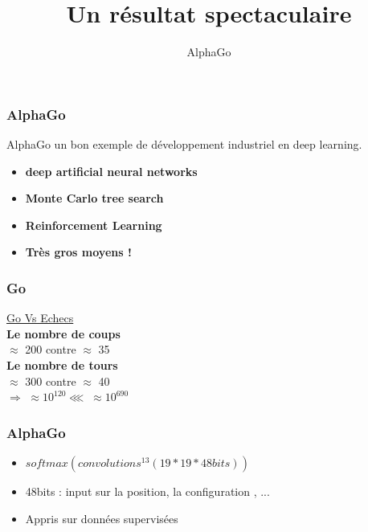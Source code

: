 \documentclass{formation}
\title{Un résultat spectaculaire}
\subtitle{AlphaGo}
\begin{document}
\maketitle

\begin{frame}
  \frametitle{AlphaGo}
  AlphaGo un bon exemple de développement industriel en deep learning.
  \begin{itemize}
  \item \textbf{deep artificial neural networks}
  \item \textbf{Monte Carlo tree search}
  \item \textbf{Reinforcement Learning}
  \item \textbf{Très gros moyens !}    
  \end{itemize}
\end{frame}

\begin{frame}
  \frametitle{Go}
  \begin{minipage}[c]{0.6\linewidth}
  \end{minipage}\hfill
  \begin{minipage}[c]{0.33\linewidth}
    \begin{center}
      \underline{Go Vs Echecs} \\
      \textbf{Le nombre de coups} \\
      $\approx$ 200 contre $\approx$ 35 \\
      \textbf{Le nombre de tours} \\
      $\approx$ 300 contre $\approx$ 40 \\
      $\Rightarrow$ $\approx 10^{120}\lll \;\approx 10^{690}$
    \end{center}
  \end{minipage}\hfill
\end{frame}

\begin{frame}
  \frametitle{AlphaGo}
  \begin{minipage}[c]{0.50\linewidth}
    \begin{itemize}
    \item $softmax(convolutions^{13}(19*19*48{bits}))$
    \item 48bits : input sur la position, la configuration , ...
    \item Appris sur données supervisées
    \end{itemize}
  \end{minipage}\hfill
  \begin{minipage}[c]{0.49\linewidth}
  \end{minipage}\hfill
\end{frame}
\end{document}
